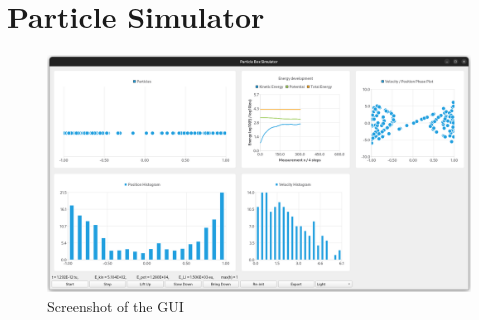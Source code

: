 \chapter{Particle Simulator}
\label{chap:particle-simulator}




\begin{figure}[H]
  \centering
  \label{fig:gui-screenshot}
  \includegraphics[width=\linewidth]{../figures/gui-screenshot.png}
  \caption{Screenshot of the GUI}
\end{figure}
